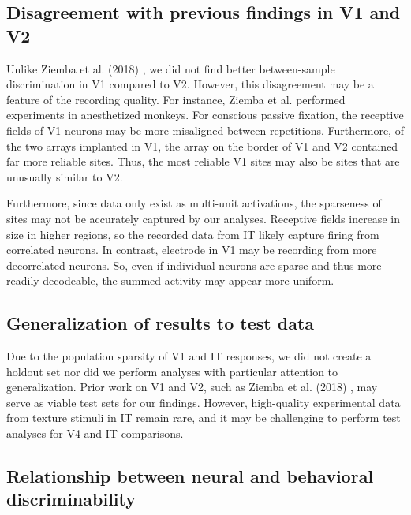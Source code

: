 \documentclass[draft]{cmustatproposal} %
\newenvironment{todoblock}{\color{purple}}{}
\begin{document}
\subsection{Disagreement with previous findings in V1 and V2}

\begin{todoblock}
Unlike Ziemba et al. (2018) \cite{ziemba_contextual_2018}, we did not find better between-sample discrimination in V1 compared to V2. However, this disagreement may be a feature of the recording quality. For instance, Ziemba et al. performed experiments in anesthetized monkeys. For conscious passive fixation, the receptive fields of V1 neurons may be more misaligned between repetitions. Furthermore, of the two arrays implanted in V1, the array on the border of V1 and V2 contained far more reliable sites. Thus, the most reliable V1 sites may also be sites that are unusually similar to V2.

Furthermore, since data only exist as multi-unit activations, the sparseness of sites may not be accurately captured by our analyses. Receptive fields increase in size in higher regions, so the recorded data from IT likely capture firing from correlated neurons. In contrast, electrode in V1 may be recording from more decorrelated neurons. So, even if individual neurons are sparse and thus more readily decodeable, the summed activity may appear more uniform. 
\end{todoblock}

\subsection{Generalization of results to test data}

\begin{todoblock}
Due to the population sparsity of V1 and IT responses, we did not create a holdout set nor did we perform analyses with particular attention to generalization. Prior work on V1 and V2, such as Ziemba et al. (2018) \cite{ziemba_contextual_2018}, may serve as viable test sets for our findings. However, high-quality experimental data from texture stimuli in IT remain rare, and it may be challenging to perform test analyses for V4 and IT comparisons.
\end{todoblock}

\subsection{Relationship between neural and behavioral discriminability}
\end{document}
